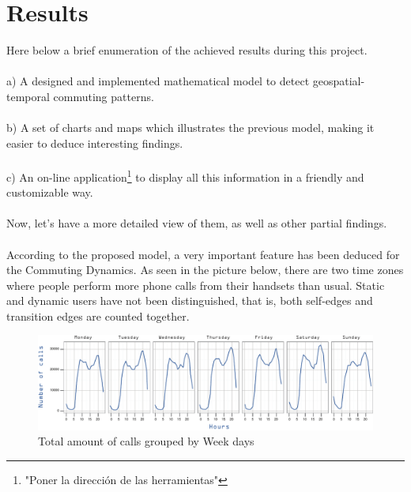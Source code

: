 \newpage
\section{Results}
\label{sec:results}

Here below a brief enumeration of the achieved results during this project.
\\
\\
a) A designed and implemented mathematical model to detect geospatial-temporal commuting patterns.
\\
\\
b) A set of charts and maps which illustrates the previous model, making it easier to deduce interesting findings.
\\
\\
c) An on-line application\footnote{"Poner la dirección de las herramientas"} to display all this information in a friendly and customizable way.
\\
\\
Now, let's have a more detailed view of them, as well as other partial findings.
\\
\\
According to the proposed model, a very important feature has been deduced for the Commuting Dynamics. As seen in the picture below, there are two time zones where people perform more phone calls from their handsets than usual. Static and dynamic users have not been distinguished, that is, both self-edges and transition edges are counted together.

\begin{figure}[h]
\begin{center}
\includegraphics[scale =0.8] {results/images/calls_number.pdf}
\caption{Total amount of calls grouped by Week days}
\label{fig:count_calls}
\end{center}
\end{figure}


